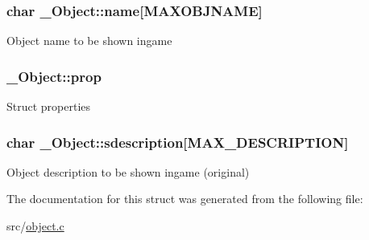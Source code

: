 \subsubsection[{\texorpdfstring{name}{name}}]{\setlength{\rightskip}{0pt plus 5cm}char \+\_\+\+Object\+::name\mbox{[}{\bf M\+A\+X\+O\+B\+J\+N\+A\+ME}\mbox{]}}\hypertarget{struct__Object_ada77f97bbe2b9be36715adba222eebc6}{}\label{struct__Object_ada77f97bbe2b9be36715adba222eebc6}
Object name to be shown ingame 
\subsubsection[{\texorpdfstring{prop}{prop}}]{ \+\_\+\+Object\+::prop}\hypertarget{struct__Object_a2acdcc90e7417c2ab1bc41e52a107c2d}{}\label{struct__Object_a2acdcc90e7417c2ab1bc41e52a107c2d}
Struct properties 
\subsubsection[{\texorpdfstring{sdescription}{sdescription}}]{\setlength{\rightskip}{0pt plus 5cm}char \+\_\+\+Object\+::sdescription\mbox{[}{\bf M\+A\+X\+\_\+\+D\+E\+S\+C\+R\+I\+P\+T\+I\+ON}\mbox{]}}\hypertarget{struct__Object_ae9fbe2f03c6902aa879c5ff437fa2444}{}\label{struct__Object_ae9fbe2f03c6902aa879c5ff437fa2444}
Object description to be shown ingame (original) 

The documentation for this struct was generated from the following file\+:\begin{DoxyCompactItemize}
\item 
src/\hyperlink{object_8c}{object.\+c}\end{DoxyCompactItemize}
